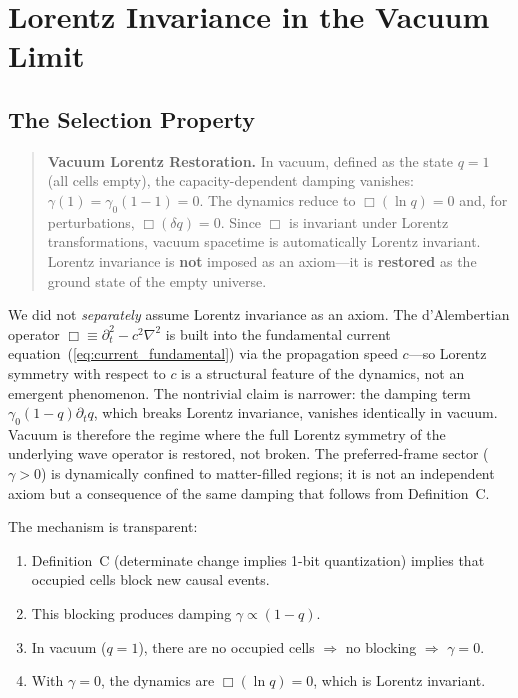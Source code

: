 \documentclass[aps,prd,twocolumn,showpacs,superscriptaddress,preprintnumbers]{revtex4-2}
\begin{document}
\section{Lorentz Invariance in the Vacuum Limit}
\label{sec:lorentz}

\subsection{The Selection Property}

\begin{quote}
\textbf{Vacuum Lorentz Restoration.}
In vacuum, defined as the state $q=1$ (all cells empty), the capacity-dependent damping vanishes: $\gamma(1)=\gamma_0(1-1)=0$.
The dynamics reduce to $\Box(\ln q)=0$ and, for perturbations, $\Box(\delta q)=0$.
Since $\Box$ is invariant under Lorentz transformations, vacuum spacetime is automatically Lorentz invariant.
Lorentz invariance is \textbf{not} imposed as an axiom---it is \textbf{restored} as the ground state of the empty universe.
\end{quote}

We did not \emph{separately} assume Lorentz invariance as an axiom.
The d'Alembertian operator $\Box \equiv \partial_t^2 - c^2\nabla^2$ is built into the fundamental current equation~(\ref{eq:current_fundamental}) via the propagation speed $c$---so Lorentz symmetry with respect to $c$ is a structural feature of the dynamics, not an emergent phenomenon.
The nontrivial claim is narrower: the damping term $\gamma_0(1-q)\partial_t q$, which breaks Lorentz invariance, vanishes identically in vacuum.
Vacuum is therefore the regime where the full Lorentz symmetry of the underlying wave operator is restored, not broken.
The preferred-frame sector ($\gamma>0$) is dynamically confined to matter-filled regions; it is not an independent axiom but a consequence of the same damping that follows from Definition~C.

The mechanism is transparent:
\begin{enumerate}
    \item Definition~C (determinate change implies 1-bit quantization) implies that occupied cells block new causal events.
    \item This blocking produces damping $\gamma\propto(1-q)$.
    \item In vacuum ($q=1$), there are no occupied cells $\Rightarrow$ no blocking $\Rightarrow$ $\gamma=0$.
    \item With $\gamma=0$, the dynamics are $\Box(\ln q)=0$, which is Lorentz invariant.
\end{enumerate}
\end{document}
